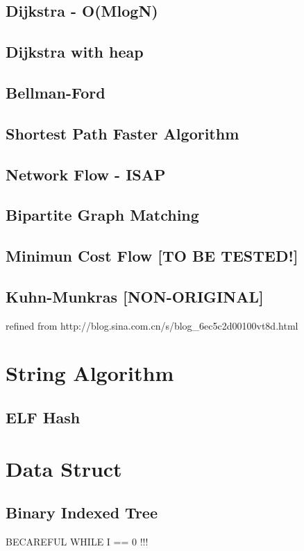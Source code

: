 \documentclass[a4paper]{article}
\begin{document}
\subsection{Dijkstra - O(MlogN)}

\subsection{Dijkstra with heap}

\subsection{Bellman-Ford}

\subsection{Shortest Path Faster Algorithm}

\subsection{Network Flow - ISAP}

\subsection{Bipartite Graph Matching}

\subsection{Minimun Cost Flow [TO BE TESTED!]}

\subsection{Kuhn-Munkras [NON-ORIGINAL]}
refined from http://blog.sina.com.cn/s/blog\_6ec5c2d00100vt8d.html

\section{String Algorithm}
\subsection{ELF Hash}

\section{Data Struct}
\subsection {Binary Indexed Tree}
BECAREFUL WHILE I == 0 !!!

\end{document}
